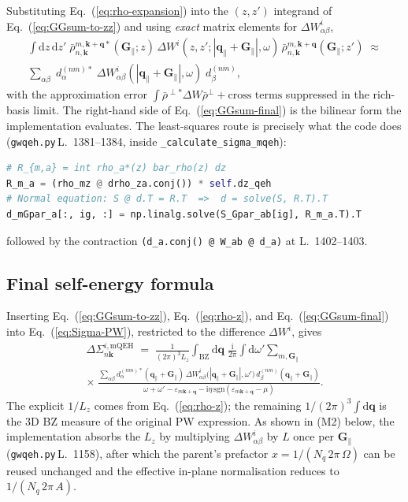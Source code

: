 \documentclass[11pt,a4paper]{article}
\newcommand{\qq}{\mathbf{q}}
\newcommand{\kk}{\mathbf{k}}
\newcommand{\Gpar}{\mathbf{G}_{\!\parallel}}
\newcommand{\qpar}{\mathbf{q}_{\parallel}}
\newcommand{\dd}{\mathrm{d}}
\newcommand{\im}{\mathrm{i}}
\newcommand{\sgn}{\mathrm{sgn}}
\newcommand{\eps}{\varepsilon}
\newcommand{\eq}[1]{Eq.~(\ref{eq:#1})}
\begin{document}
Substituting \eq{rho-expansion} into the $(z,z')$ integrand of
\eq{GGsum-to-zz} and using \emph{exact} matrix elements for
$\Delta W^{i}_{\alpha\beta}$,
\begin{multline}
\int\!\dd z\,\dd z'\;
\bar\rho^{m,\kk+\qq*}_{n,\kk}(\Gpar;z)\,
\Delta W^{i}(z,z';|\qpar+\Gpar|,\omega)\,
\bar\rho^{m,\kk+\qq}_{n,\kk}(\Gpar;z')
\;\approx\\
\sum_{\alpha\beta}\;
d^{(nm)*}_{\alpha}\;\Delta W^{i}_{\alpha\beta}(|\qpar+\Gpar|,\omega)\;
d^{(nm)}_{\beta},
\label{eq:GGsum-final}
\end{multline}
with the approximation error
$\int\bar\rho^{\perp*}\Delta W\bar\rho^{\perp}+\text{cross terms}$
suppressed in the rich-basis limit.  The right-hand side of
\eq{GGsum-final} is the bilinear form the implementation evaluates.
The least-squares route is precisely what the code does
(\texttt{gwqeh.py}\,L.~1381--1384, inside
\texttt{\_calculate\_sigma\_mqeh}):
\begin{lstlisting}[language=Python]
# R_{m,a} = int rho_a*(z) bar_rho(z) dz
R_m_a = (rho_mz @ drho_za.conj()) * self.dz_qeh
# Normal equation: S @ d.T = R.T  =>  d = solve(S, R.T).T
d_mGpar_a[:, ig, :] = np.linalg.solve(S_Gpar_ab[ig], R_m_a.T).T
\end{lstlisting}
followed by the contraction \texttt{(d\_a.conj() @ W\_ab @ d\_a)}
at L.~1402--1403.

\subsection{Final self-energy formula}

Inserting \eq{GGsum-to-zz}, \eq{rho-z}, and \eq{GGsum-final} into
\eq{Sigma-PW}, restricted to the difference $\Delta W^i$, gives
\begin{multline}
\Delta\Sigma^{i,\text{mQEH}}_{n\kk}\;=\;
\frac{1}{(2\pi)^3 L_z}\!\int_\text{BZ}\!\dd\qq\;
\frac{\im}{2\pi}\!\int\dd\omega'\!\sum_{m,\Gpar}\\[2pt]
\times\;
\frac{\sum_{\alpha\beta}
   d^{(nm)*}_{\alpha}(\qpar+\Gpar)\,
   \Delta W^{i}_{\alpha\beta}\!\bigl(|\qpar+\Gpar|,\omega'\bigr)\,
   d^{(nm)}_{\beta}(\qpar+\Gpar)}
{\omega+\omega'-\eps_{m\kk+\qq}-\im\eta\,\sgn(\eps_{m\kk+\qq}-\mu)}.
\label{eq:Sigma-mQEH-final}
\end{multline}
The explicit $1/L_z$ comes from \eq{rho-z}; the remaining
$1/(2\pi)^3\!\int\dd\qq$ is the 3D BZ measure of the original PW
expression.  As shown in (M2) below, the implementation absorbs the
$L_z$ by multiplying $\Delta W^{i}_{\alpha\beta}$ by $L$ once per
$\Gpar$ (\texttt{gwqeh.py}\,L.~1158), after which the parent's
prefactor $x = 1/(N_q\,2\pi\,\Omega)$ can be reused unchanged and the
effective in-plane normalisation reduces to $1/(N_q\,2\pi\,A)$.
\end{document}
